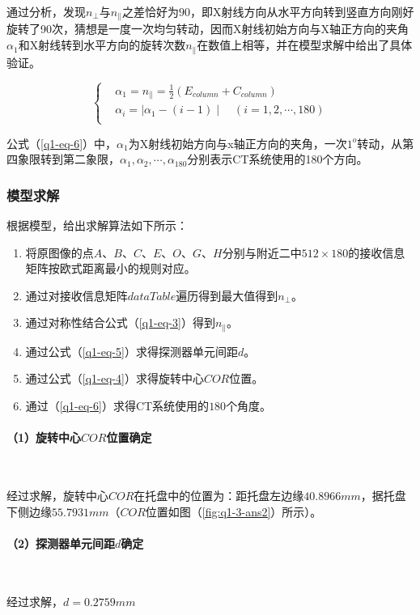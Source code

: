 \documentclass[withoutpreface,bwprint]{cumcmthesis} %
\begin{document}
通过分析，发现$n_{\perp}$与$n_{\parallel}$之差恰好为$90$，即X射线方向从水平方向转到竖直方向刚好旋转了90次，猜想是一度一次均匀转动，因而X射线初始方向与X轴正方向的夹角$\alpha_1$和X射线转到水平方向的旋转次数$n_{\parallel}$在数值上相等，并在模型求解中给出了具体验证。

\begin{equation}
	\label{q1-eq-6}
	\left\{
	\begin{split}
		& \alpha_1 = n_{\parallel} = \frac{1}{2}(E_{column} + C_{column})\\
		& \alpha_i = \mid \alpha_1 -  (i-1) \mid \quad (i = 1,2,\cdots,180)\\
	\end{split}
	\right.
\end{equation}

公式（\ref{q1-eq-6}）中，$\alpha_1$为X射线初始方向与x轴正方向的夹角，一次$1^o$转动，从第四象限转到第二象限，$\alpha_1,\alpha_2,\cdots,\alpha_{180}$分别表示CT系统使用的180个方向。

\subsubsection{模型求解}
根据模型，给出求解算法如下所示：
\begin{enumerate}
	\item 将原图像的点$A$、$B$、$C$、$E$、$O$、$G$、$H$分别与附近二中$512\times 180$的接收信息矩阵按欧式距离最小的规则对应。
	\item 通过对接收信息矩阵$dataTable$遍历得到最大值得到$n_{\perp}$。
	\item 通过对称性结合公式（\ref{q1-eq-3}）得到$n_{\parallel}$。
	\item 通过公式（\ref{q1-eq-5}）求得探测器单元间距$d$。
	\item 通过公式（\ref{q1-eq-4}）求得旋转中心$COR$位置。
	\item 通过（\ref{q1-eq-6}）求得CT系统使用的$180$个角度。
\end{enumerate}
\paragraph*{（1）旋转中心$COR$位置确定}~\\

\par 经过求解，旋转中心$COR$在托盘中的位置为：距托盘左边缘$40.8966mm$，据托盘下侧边缘$55.7931mm$（$COR$位置如图（\ref{fig:q1-3-ans2}）所示）。

\paragraph*{（2）探测器单元间距$d$确定}~\\
\par 经过求解，$d = 0.2759mm$
\end{document}
